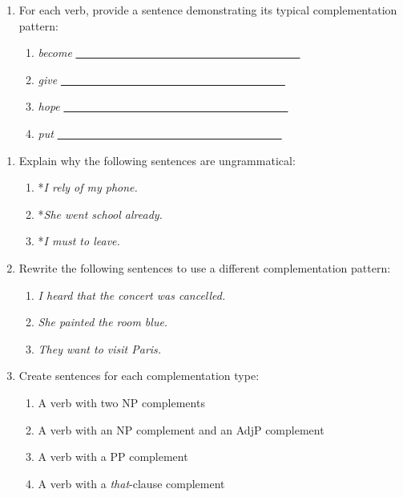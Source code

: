 \begin{tcolorbox}[title=Exercise: Verb Complementation Patterns, colback=white, colframe=red!75!black, fonttitle=\bfseries]
\begin{enumerate}[nosep]
\item For each verb, provide a sentence demonstrating its typical complementation pattern:

   \begin{enumerate}[nosep]
   \item \textit{become} \hfill\uline{~~~~~~~~~~~~~~~~~~~~~~~~~~~~~~~~~~~~~~~~}
   \item \textit{give} \hfill\uline{~~~~~~~~~~~~~~~~~~~~~~~~~~~~~~~~~~~~~~~~}
   \item \textit{hope} \hfill\uline{~~~~~~~~~~~~~~~~~~~~~~~~~~~~~~~~~~~~~~~~}
   \item \textit{put} \hfill\uline{~~~~~~~~~~~~~~~~~~~~~~~~~~~~~~~~~~~~~~~~}
   \end{enumerate}
\end{enumerate}
\end{tcolorbox}

\begin{tcolorbox}[title=Exercise: Verb Complementation Patterns (continued), colback=white, colframe=red!75!black, fonttitle=\bfseries]

\begin{enumerate}[nosep]
\item Explain why the following sentences are ungrammatical:

   \begin{enumerate}[nosep]
   \item *\textit{I rely of my phone.}
   \item *\textit{She went school already.}
   \item *\textit{I must to leave.}
   \end{enumerate}

\item Rewrite the following sentences to use a different complementation pattern:

   \begin{enumerate}[nosep]
   \item \textit{I heard that the concert was cancelled.}
   \item \textit{She painted the room blue.}
   \item \textit{They want to visit Paris.}
   \end{enumerate}

\item Create sentences for each complementation type:

   \begin{enumerate}[nosep]
   \item A verb with two NP complements
   \item A verb with an NP complement and an AdjP complement
   \item A verb with a PP complement
   \item A verb with a \textit{that}-clause complement
   \end{enumerate}

\end{enumerate}
\end{tcolorbox}


